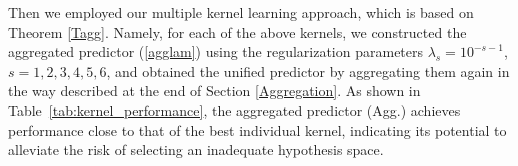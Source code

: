 \documentclass[twoside,11pt]{article}
\begin{document}
Then we employed our multiple kernel learning approach, which is based on Theorem \ref{Tagg}. Namely, for each of the above kernels, we constructed the aggregated predictor (\ref{agglam}) 
using the regularization parameters $\lambda_s = 10^{-s-1}$, $s = 1,2,3,4,5,6$, and obtained the unified predictor by aggregating them again in the way described at the end of Section \ref{Aggregation}.
 As shown in Table~\ref{tab:kernel_performance}, the aggregated predictor (Agg.) achieves performance close to that of the best individual kernel, indicating its potential to alleviate the risk of selecting an inadequate hypothesis space.

\newpage
\end{document}
